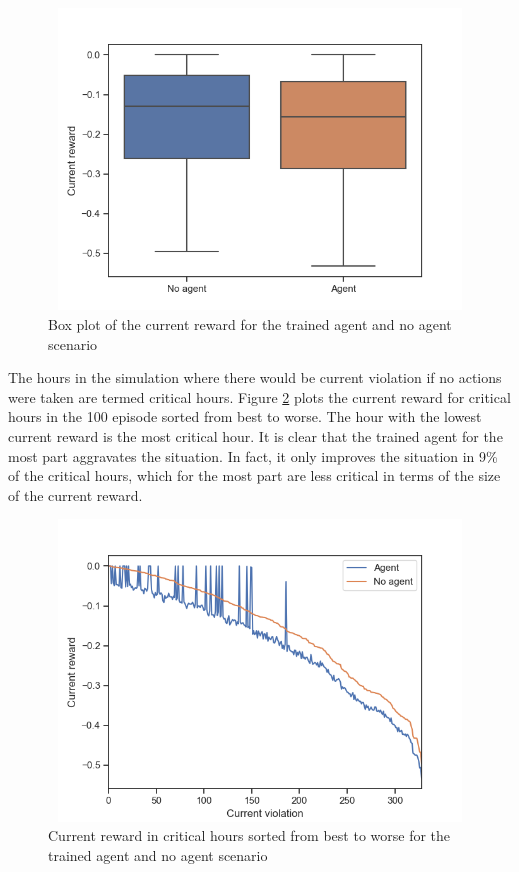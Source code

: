 \documentclass[class=book, crop=false]{standalone}
\begin{document}
\begin{figure}[H]
    \center
\includegraphics[height=8cm, width=12cm]{figures/config1_100ep_boxplot_current.png}
    \caption[size = 9]{Box plot of the current reward for the trained agent and no agent scenario}
    \label{fig:results:config1_100ep_boxplot_current}
\end{figure}
The hours in the simulation where there would be current violation if no actions were taken are termed critical hours. Figure \ref{fig:results:config1_sorted_current} plots the current reward for critical hours in the 100 episode sorted from best to worse. The hour with the lowest current reward is the most critical hour. It is clear that the trained agent for the most part aggravates the situation. In fact, it only improves the situation in 9\% of the critical hours, which for the most part are less critical in terms of the size of the current reward. 

\begin{figure}[H]
    \center
\includegraphics[height=8cm, width=12cm]{figures/config1_sorted_current.png}
    \caption[size = 9]{Current reward in critical hours sorted from best to worse for the trained agent and no agent scenario}
    \label{fig:results:config1_sorted_current}
\end{figure}
\end{document}
